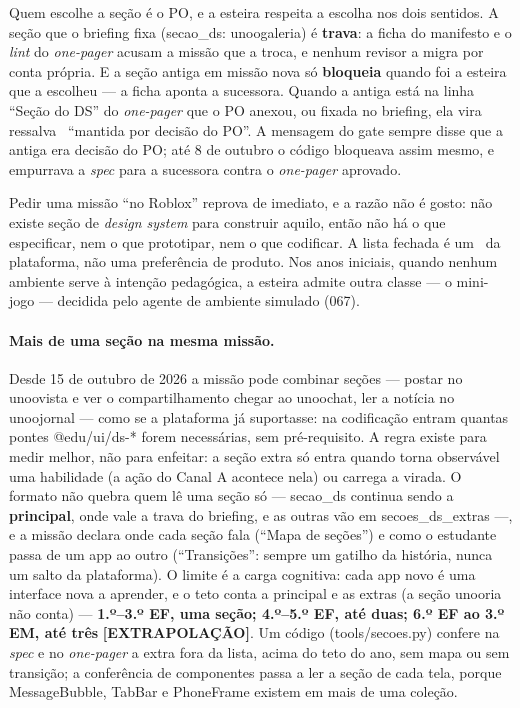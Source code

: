 \documentclass[11pt,a4paper]{article}
\newcommand{\cod}[1]{{\ttfamily\small #1}}
\newcommand{\bolinha}[1]{\tikz[baseline=-0.5ex]{\fill[#1] (0,0) circle (0.33em);}}
\newcommand{\statusAmbar}{\bolinha{sinalAmbar}}
\newcommand{\selo}[2]{\tikz[baseline=(x.base)]{\node[fill=#1,rounded corners=1.6pt,inner xsep=3.6pt,inner ysep=1.6pt,text=white,font=\sffamily\bfseries\scriptsize] (x) {#2};}}
\newcommand{\Contrato}{\selo{unAzul}{CONTRATO}}
\begin{document}
Quem escolhe a seção é o PO, e a esteira respeita a escolha nos dois sentidos. A seção que o briefing fixa (\cod{secao\_ds: unoogaleria}) é \textbf{trava}: a ficha do manifesto e o \emph{lint} do \emph{one-pager} acusam a missão que a troca, e nenhum revisor a migra por conta própria. E a seção antiga em missão nova só \textbf{bloqueia} quando foi a esteira que a escolheu --- a ficha aponta a sucessora. Quando a antiga está na linha ``Seção do DS'' do \emph{one-pager} que o PO anexou, ou fixada no briefing, ela vira ressalva \statusAmbar\ ``mantida por decisão do PO''. A mensagem do gate sempre disse que a antiga era decisão do PO; até 8 de outubro o código bloqueava assim mesmo, e empurrava a \emph{spec} para a sucessora contra o \emph{one-pager} aprovado.

Pedir uma missão ``no Roblox'' reprova de imediato, e a razão não é gosto: não existe seção de \emph{design system} para construir aquilo, então não há o que especificar, nem o que prototipar, nem o que codificar. A lista fechada é um \Contrato\ da plataforma, não uma preferência de produto. Nos anos iniciais, quando nenhum ambiente serve à intenção pedagógica, a esteira admite outra classe --- o mini-jogo --- decidida pelo agente de ambiente simulado (067).

\paragraph{Mais de uma seção na mesma missão.} Desde 15 de outubro de 2026 a missão pode combinar seções --- postar no \cod{unoovista} e ver o compartilhamento chegar ao \cod{unoochat}, ler a notícia no \cod{unoojornal} --- como se a plataforma já suportasse: na codificação entram quantas pontes \cod{@edu/ui/ds-*} forem necessárias, sem pré-requisito. A regra existe para medir melhor, não para enfeitar: a seção extra só entra quando torna observável uma habilidade (a ação do Canal A acontece nela) ou carrega a virada. O formato não quebra quem lê uma seção só --- \cod{secao\_ds} continua sendo a \textbf{principal}, onde vale a trava do briefing, e as outras vão em \cod{secoes\_ds\_extras} ---, e a missão declara onde cada seção fala (``Mapa de seções'') e como o estudante passa de um app ao outro (``Transições'': sempre um gatilho da história, nunca um salto da plataforma). O limite é a carga cognitiva: cada app novo é uma interface nova a aprender, e o teto conta a principal e as extras (a seção \cod{unooria} não conta) --- \textbf{1.º--3.º EF, uma seção; 4.º--5.º EF, até duas; 6.º EF ao 3.º EM, até três} \textbf{[EXTRAPOLAÇÃO]}. Um código (\cod{tools/secoes.py}) confere na \emph{spec} e no \emph{one-pager} a extra fora da lista, acima do teto do ano, sem mapa ou sem transição; a conferência de componentes passa a ler a seção de cada tela, porque \cod{MessageBubble}, \cod{TabBar} e \cod{PhoneFrame} existem em mais de uma coleção.
\end{document}
